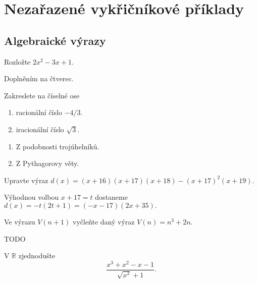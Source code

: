 \section{Nezařazené vykřičníkové příklady}
\subsection{Algebraické výrazy}
\begin{priklad}
    Rozložte $2x^2 - 3x+1.$
\end{priklad}

\begin{reseni}
Doplněním na čtverec.
\end{reseni}

\begin{priklad}
    Zakreslete na číselné ose
    \begin{enumerate}[$a.$]
    \item racionální číslo $-4/3.$
   	\item iracionální číslo $\sqrt{3}. $
    \end{enumerate}
\end{priklad}

\begin{reseni}
\begin{enumerate}[$a.$]
\item Z podobnosti trojúhelníků.
\item Z Pythagorovy věty.
\end{enumerate}
\end{reseni}

\begin{priklad}
    Upravte výraz $d(x)=(x+16)(x+17)(x+18)-(x+17)^2(x+19).$
\end{priklad}

\begin{reseni}
 Výhodnou volbou $x+17=t$ dostaneme $d(x)=-t(2t+1)=(-x-17)(2x+35).$
\end{reseni}

\begin{priklad}
    Ve výrazu $V(n+1)$ vyčleňte daný výraz $V(n)=n^3+2n.$
\end{priklad}

\begin{reseni}
 TODO
\end{reseni}

\begin{priklad}
V $\mathbb R$ zjednodušte
$$\frac{x^3+x^2-x-1}{\sqrt{x^2}+1 }.$$
\end{priklad}

